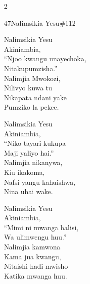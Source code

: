 \documentclass{article}
\begin{document}
\begin{multicols}{2}
\begin{hymn}{47}{Nalimsikia Yesu}{\#112}
\begin{stanza}
Nalimsikia Yesu\\
Akiniambia,\\
``Njoo kwangu unayechoka,\\
Nitakupumzisha.''\\
Nalimjia Mwokozi,\\
Nilivyo kuwa tu\\
Nikapata ndani yake\\
Pumziko la pekee.
\end{stanza}
\begin{stanza}
Nalimsikia Yesu\\
Akiniambia,\\
``Niko tayari kukupa\\
Maji yaliyo hai.''\\
Nalimjia nikanywa,\\
Kiu ikakoma,\\
Nafsi yangu kahuishwa,\\
Nina uhai wake.
\end{stanza}
\begin{stanza}
Nalimsikia Yesu\\
Akiniambia,\\
``Mimi ni mwanga halisi,\\
Wa ulimwengu huu.''\\
Nalimjia kamwona\\
Kama jua kwangu,\\
Nitaishi hadi mwisho\\
Katika mwanga huu.
\end{stanza}
\end{hymn}


\end{multicols}
\end{document}
